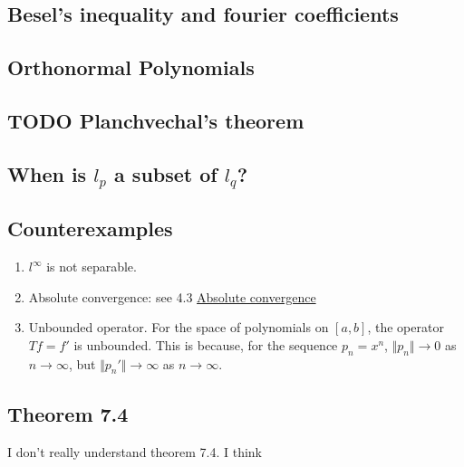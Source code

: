 \documentclass[11pt]{article}
\begin{document}
\subsection{Besel's inequality and fourier coefficients}
\label{sec:orgdbe6cd5}
\subsection{Orthonormal Polynomials}
\label{sec:orgd679153}
\subsection{{\bfseries\sffamily TODO} Planchvechal's theorem}
\label{sec:org248ca06}
\subsection{When is \(l_p\) a subset of \(l_q\)?}
\label{sec:org49c8229}
\subsection{Counterexamples}
\label{sec:org4393a06}
\begin{enumerate}
\item \(l^\infty\) is not separable.
\item Absolute convergence: see 4.3 \hyperref[sec:org7a73e52]{Absolute convergence}
\item Unbounded operator. For the space of polynomials on \([a, b]\), the operator
\(Tf = f'\) is unbounded. This is because, for the sequence \(p_n = x^n\),
\(\Vert p_n \Vert \rightarrow 0\) as \(n \rightarrow \infty\), but \(\Vert
      p_n'\Vert \rightarrow \infty\) as \(n\rightarrow \infty\).
\end{enumerate}
\subsection{Theorem 7.4}
\label{sec:orgd82574c}
I don't really understand theorem 7.4. I think 
\end{document}
